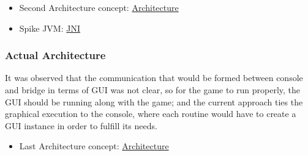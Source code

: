 \begin{itemize}
    \item Second Architecture concept: \href{https://github.com/Pending-Name-21/arquitecture/pull/5}{Architecture}
    \item Spike JVM: \href{https://tree.taiga.io/project/joseluis-teran-coffeetime/us/2?milestone=390348}{JNI}
\end{itemize}

\subsubsection{Actual Architecture}
It was observed that the communication that would be formed between console and bridge in terms of GUI was not clear, so for the game to run properly, the GUI should be running along with the game; and the current approach ties the graphical execution to the console, where each routine would have to create a GUI instance in order to fulfill its needs.

\begin{itemize}
    \item Last Architecture concept: \href{https://github.com/Pending-Name-21/arquitecture/pull/12}{Architecture}
\end{itemize}
